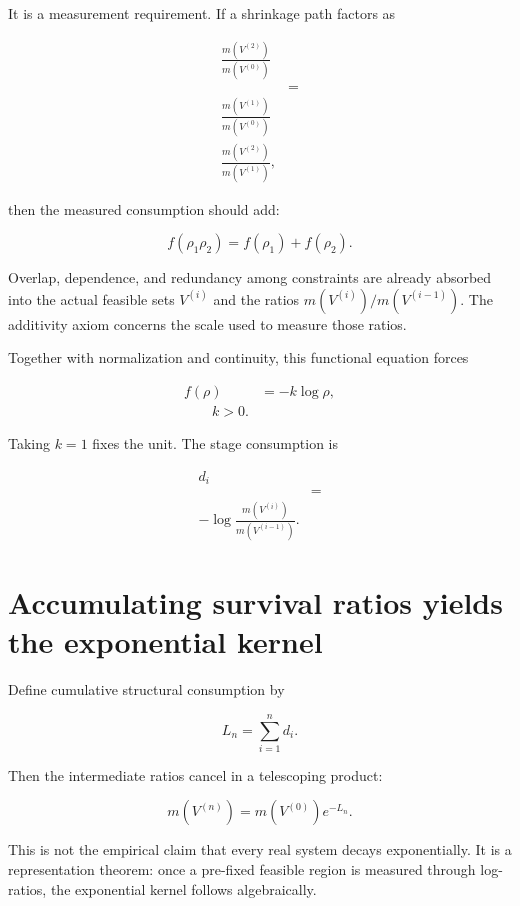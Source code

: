 \documentclass[12pt,a4paper]{article}
\begin{document}
It is a measurement requirement. If a shrinkage path factors as

\[
\begin{aligned}
\frac{m(V^{(2)})}{m(V^{(0)})} \\
&= \\
\frac{m(V^{(1)})}{m(V^{(0)})} \\
\frac{m(V^{(2)})}{m(V^{(1)})},
\end{aligned}
\]

then the measured consumption should add:

\[
f(\rho_1\rho_2)=f(\rho_1)+f(\rho_2).
\]

Overlap, dependence, and redundancy among constraints are already absorbed into the actual feasible sets \(V^{(i)}\) and the ratios \(m(V^{(i)})/m(V^{(i-1)})\). The additivity axiom concerns the scale used to measure those ratios.

Together with normalization and continuity, this functional equation forces

\[
\begin{aligned}
f(\rho)&=-k\log \rho, \\
\qquad k>0.
\end{aligned}
\]

Taking \(k=1\) fixes the unit. The stage consumption is

\[
\begin{aligned}
d_{i} \\
&= \\
-\log\frac{m(V^{(i)})}{m(V^{(i-1)})}.
\end{aligned}
\]

\section{Accumulating survival ratios yields the exponential kernel}\label{accumulating-survival-ratios-yields-the-exponential-kernel}

Define cumulative structural consumption by

\[
L_{n}=\sum_{i=1}^{n} d_{i}.
\]

Then the intermediate ratios cancel in a telescoping product:

\[
m(V^{(n)})=m(V^{(0)})e^{-L_{n}}.
\]

This is not the empirical claim that every real system decays exponentially. It is a representation theorem: once a pre-fixed feasible region is measured through log-ratios, the exponential kernel follows algebraically.
\end{document}
